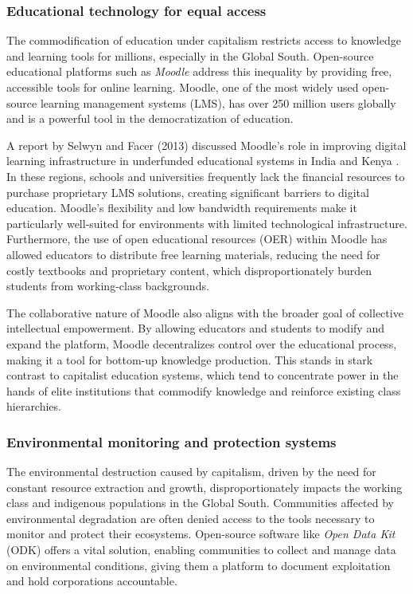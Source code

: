 \begin{refsection}
\subsubsection{Educational technology for equal access}

The commodification of education under capitalism restricts access to knowledge and learning tools for millions, especially in the Global South. Open-source educational platforms such as \textit{Moodle} address this inequality by providing free, accessible tools for online learning. Moodle, one of the most widely used open-source learning management systems (LMS), has over 250 million users globally and is a powerful tool in the democratization of education.

A report by Selwyn and Facer (2013) discussed Moodle’s role in improving digital learning infrastructure in underfunded educational systems in India and Kenya \cite[pp.~90-93]{selwyn2013}. In these regions, schools and universities frequently lack the financial resources to purchase proprietary LMS solutions, creating significant barriers to digital education. Moodle’s flexibility and low bandwidth requirements make it particularly well-suited for environments with limited technological infrastructure. Furthermore, the use of open educational resources (OER) within Moodle has allowed educators to distribute free learning materials, reducing the need for costly textbooks and proprietary content, which disproportionately burden students from working-class backgrounds.

The collaborative nature of Moodle also aligns with the broader goal of collective intellectual empowerment. By allowing educators and students to modify and expand the platform, Moodle decentralizes control over the educational process, making it a tool for bottom-up knowledge production. This stands in stark contrast to capitalist education systems, which tend to concentrate power in the hands of elite institutions that commodify knowledge and reinforce existing class hierarchies.

\subsubsection{Environmental monitoring and protection systems}

The environmental destruction caused by capitalism, driven by the need for constant resource extraction and growth, disproportionately impacts the working class and indigenous populations in the Global South. Communities affected by environmental degradation are often denied access to the tools necessary to monitor and protect their ecosystems. Open-source software like \textit{Open Data Kit} (ODK) offers a vital solution, enabling communities to collect and manage data on environmental conditions, giving them a platform to document exploitation and hold corporations accountable.


\end{refsection}
